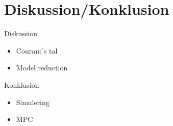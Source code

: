 % 	
% 	


\section{Diskussion/Konklusion}
\begin{frame}{Diskussion}{}
	\vfill \vfill \centering
	\begin{itemize}
		\item Courant's tal
		\item Model reduction
	\end{itemize}
	\vfill \vfill
\end{frame}


\begin{frame}{Konklusion}{}
	\vfill \vfill\centering
	\begin{itemize}
	    	\item Simulering
	    	\item MPC
	\end{itemize}    

	\vfill \vfill
\end{frame}
